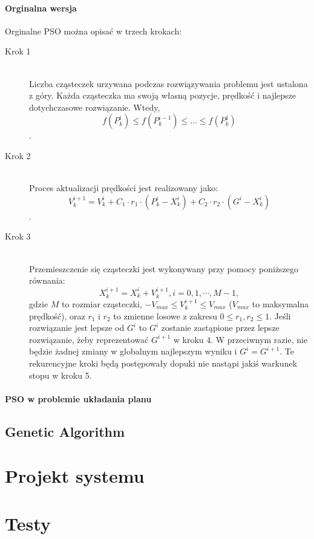 \documentclass[11pt]{report}
\begin{document}
\subsubsection{Orginalna wersja}
\par Orginalne PSO można opisać w trzech krokach:

\begin{description}
  \item[Krok 1] \hfill \\
Liczba cząsteczek urzywana podczas rozwiązywania problemu jest ustalona z góry. Każda cząsteczka ma swoją własną pozycje, prędkość i najlepsze dotychczasowe rozwiązanie. Wtedy,
  \[f(P^{i}_{k}) \le f(P^{i-1}_{k}) \le \ldots \le f(P^{1}_{k})\].

  \item[Krok 2] \hfill \\
Proces aktualizacji prędkości jest realizowany jako:
\[V^{i+1}_{k} = V^{i}_{k} + C_{1} \cdot r_{1} \cdot (P^{i}_{k} - X^{i}_{k}) + C_{2} \cdot r_{2} \cdot (G^{i} - X^{i}_{k})\].
  \item[Krok 3] \hfill \\
Przemieszczenie się cząsteczki jest wykonywany przy pomocy poniższego równania:
\[X^{i+1}_{k} = X^{i}_{k} + V^{i+1}_{k}, i = 0,1,\cdots, M-1,\]
gdzie $M$ to rozmiar cząsteczki, $-V_{max} \le V^{i+1}_{k} \le V_{max}$ ($V_{max}$ to maksymalna prędkość), oraz $r_{1}$ i $r_{2}$ to zmienne losowe z zakresu $0 \le r_{1},r_{2} \le 1$. Jeśli rozwiązanie jest lepsze od $G^{i}$ to $G^{i}$ zostanie zastąpione przez lepsze rozwiązanie, żeby reprezentować $G^{i+1}$ w kroku 4. W przeciwnym razie, nie będzie żadnej zmiany w globalnym najlepszym wyniku i $G^{i} = G^{i+1}$. Te rekurencyjne kroki będą postępowały dopuki nie nastąpi jakiś warkunek stopu w kroku 5.  
\end{description}

\subsubsection{PSO w problemie układania planu}
\section{Genetic Algorithm}
\chapter{Projekt systemu}
\chapter{Testy}
\end{document}

